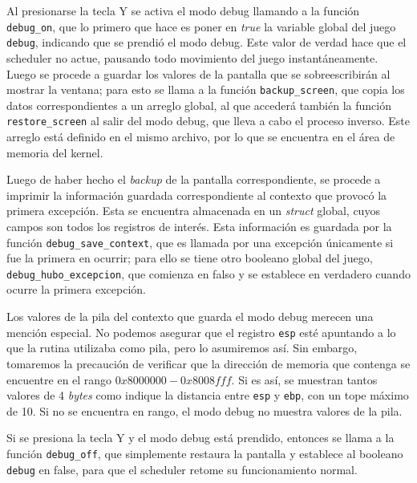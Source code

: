 \documentclass{article}
\begin{document}
	Al presionarse la tecla Y se activa el modo debug llamando a la función \texttt{debug\_on}, que lo primero que hace es poner en \textit{true} la variable global del juego \texttt{debug}, indicando que se prendió el modo debug. Este valor de verdad hace que el scheduler no actue, pausando todo movimiento del juego instantáneamente. Luego se procede a guardar los valores de la pantalla que se sobreescribirán al mostrar la ventana; para esto se llama a la función \texttt{backup\_screen}, que copia los datos correspondientes a un arreglo global, al que accederá también la función \texttt{restore\_screen} al salir del modo debug, que lleva a cabo el proceso inverso. Este arreglo está definido en el mismo archivo, por lo que se encuentra en el área de memoria del kernel.

	Luego de haber hecho el \textit{backup} de la pantalla correspondiente, se procede a imprimir la información guardada correspondiente al contexto que provocó la primera excepción. Esta se encuentra almacenada en un \textit{struct} global, cuyos campos son todos los registros de interés. Esta información es guardada por la función \texttt{debug\_save\_context}, que  es llamada por una excepción únicamente si fue la primera en ocurrir; para ello se tiene otro booleano global del juego, \texttt{debug\_hubo\_excepcion}, que comienza en falso y se establece en verdadero cuando ocurre la primera excepción.

	Los valores de la pila del contexto que guarda el modo debug merecen una mención especial. No podemos asegurar que el registro \texttt{esp} esté apuntando a lo que la rutina utilizaba como pila, pero lo asumiremos así. Sin embargo, tomaremos la precaución de verificar que la dirección de memoria que contenga se encuentre en el rango $0x8000000 - 0x8008fff$. Si es así, se muestran tantos valores de 4 \textit{bytes} como indique la distancia entre \texttt{esp} y \texttt{ebp}, con un tope máximo de 10. Si no se encuentra en rango, el modo debug no muestra valores de la pila.

	Si se presiona la tecla Y y el modo debug está prendido, entonces se llama a la función \texttt{debug\_off}, que simplemente restaura la pantalla y establece al booleano \texttt{debug} en false, para que el scheduler retome su funcionamiento normal.
\end{document}
